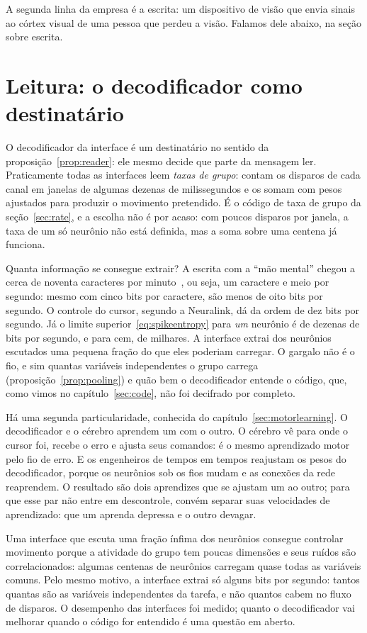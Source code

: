 A segunda linha da empresa é a escrita: um dispositivo de visão que envia sinais ao córtex visual de uma pessoa que perdeu a visão. Falamos dele abaixo, na seção sobre escrita.

\section{Leitura: o decodificador como destinatário}

O decodificador da interface é um destinatário no sentido da proposição~\ref{prop:reader}: ele mesmo decide que parte da mensagem ler. Praticamente todas as interfaces leem \emph{taxas de grupo}: contam os disparos de cada canal em janelas de algumas dezenas de milissegundos e os somam com pesos ajustados para produzir o movimento pretendido. É o código de taxa de grupo da seção~\ref{sec:rate}, e a escolha não é por acaso: com poucos disparos por janela, a taxa de um só neurônio não está definida, mas a soma sobre uma centena já funciona.

Quanta informação se consegue extrair? A escrita com a ``mão mental'' chegou a cerca de noventa caracteres por minuto~\cite{Willett2021}, ou seja, um caractere e meio por segundo: mesmo com cinco bits por caractere, são menos de oito bits por segundo. O controle do cursor, segundo a Neuralink, dá da ordem de dez bits por segundo. Já o limite superior~\eqref{eq:spikeentropy} para \emph{um} neurônio é de dezenas de bits por segundo, e para cem, de milhares. A interface extrai dos neurônios escutados uma pequena fração do que eles poderiam carregar. O gargalo não é o fio, e sim quantas variáveis independentes o grupo carrega (proposição~\ref{prop:pooling}) e quão bem o decodificador entende o código, que, como vimos no capítulo~\ref{sec:code}, não foi decifrado por completo.

Há uma segunda particularidade, conhecida do capítulo~\ref{sec:motorlearning}. O decodificador e o cérebro aprendem um com o outro. O cérebro vê para onde o cursor foi, recebe o erro e ajusta seus comandos: é o mesmo aprendizado motor pelo fio de erro. E os engenheiros de tempos em tempos reajustam os pesos do decodificador, porque os neurônios sob os fios mudam e as conexões da rede reaprendem. O resultado são dois aprendizes que se ajustam um ao outro; para que esse par não entre em descontrole, convém separar suas velocidades de aprendizado: que um aprenda depressa e o outro devagar.

\begin{keyblock}
\begin{proposition}
\label{prop:probe}
Uma interface que escuta uma fração ínfima dos neurônios consegue controlar movimento porque a atividade do grupo tem poucas dimensões e seus ruídos são correlacionados: algumas centenas de neurônios carregam quase todas as variáveis comuns. Pelo mesmo motivo, a interface extrai só alguns bits por segundo: tantos quantas são as variáveis independentes da tarefa, e não quantos cabem no fluxo de disparos. O desempenho das interfaces foi medido; quanto o decodificador vai melhorar quando o código for entendido é uma questão em aberto.
\end{proposition}
\end{keyblock}

